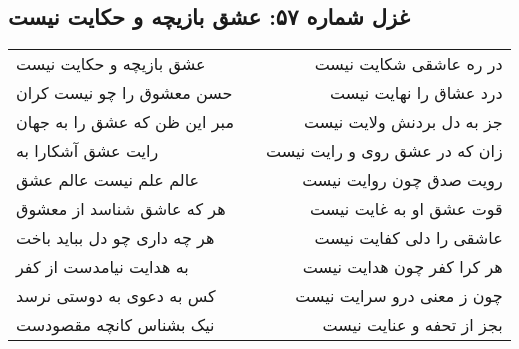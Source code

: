 \begin{center}
\section*{غزل شماره ۵۷: عشق بازیچه و حکایت نیست}
\label{sec:057}
\begin{longtable}{l p{0.5cm} r}
عشق بازیچه و حکایت نیست
&&
در ره عاشقی شکایت نیست
\\
حسن معشوق را چو نیست کران
&&
درد عشاق را نهایت نیست
\\
مبر این ظن که عشق را به جهان
&&
جز به دل بردنش ولایت نیست
\\
رایت عشق آشکارا به
&&
زان که در عشق روی و رایت نیست
\\
عالم علم نیست عالم عشق
&&
رویت صدق چون روایت نیست
\\
هر که عاشق شناسد از معشوق
&&
قوت عشق او به غایت نیست
\\
هر چه داری چو دل بباید باخت
&&
عاشقی را دلی کفایت نیست
\\
به هدایت نیامدست از کفر
&&
هر کرا کفر چون هدایت نیست
\\
کس به دعوی به دوستی نرسد
&&
چون ز معنی درو سرایت نیست
\\
نیک بشناس کانچه مقصودست
&&
بجز از تحفه و عنایت نیست
\\
\end{longtable}
\end{center}
